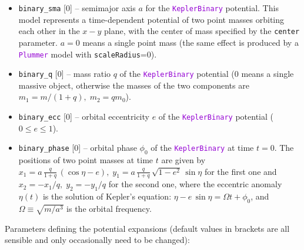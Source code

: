 \documentclass[12pt]{article}
\newcommand{\ttt}[1]{\textcolor{darkviolet}{\texttt{#1}}}
\newcommand{\ppp}[1]{\textcolor{darkolive} {\texttt{#1}}}
\begin{document}
\begin{itemize}
\item \ppp{binary_sma} [0] -- semimajor axis $a$ for the \ttt{KeplerBinary} potential. This model represents a time-dependent potential of two point masses orbiting each other in the $x-y$ plane, with the center of mass specified by the \ppp{center} parameter. $a=0$ means a single point mass (the same effect is produced by a \ttt{Plummer} model with \ppp{scaleRadius}=0).
\item \ppp{binary_q} [0] -- mass ratio $q$ of the \ttt{KeplerBinary} potential (0 means a single massive object, otherwise the masses of the two components are $m_1=m/(1+q),\; m_2=qm_0$).
\item \ppp{binary_ecc} [0] -- orbital eccentricity $e$ of the \ttt{KeplerBinary} potential ($0\le e \le 1$).
\item \ppp{binary_phase} [0] -- orbital phase $\phi_0$ of the \ttt{KeplerBinary} at time $t=0$. The positions of two point masses at time $t$ are given by $x_1 = a\,\frac{q}{1+q}\, (\cos\eta-e),\; y_1 = a\,\frac{q}{1+q}\,\sqrt{1-e^2}\,\sin\eta$ for the first one and $x_2=-x_1/q,\; y_2=-y_1/q$ for the second one, where the eccentric anomaly $\eta(t)$ is the solution of Kepler's equation: $\eta - e\,\sin\eta = \Omega t + \phi_0$, and $\Omega \equiv \sqrt{m/a^3}$ is the orbital frequency.
\end{itemize}
Parameters defining the potential expansions (default values in brackets are all sensible and only occasionally need to be changed):
\end{document}
